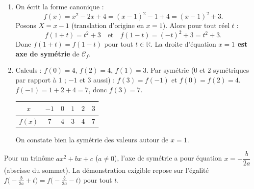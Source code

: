 \documentclass[11pt]{article}
\begin{document}
\begin{corrige}
\begin{enumerate}
    \item On écrit la forme canonique :
    \[ f(x)=x^2-2x+4=(x-1)^2-1+4=(x-1)^2+3. \]
    Posons $X=x-1$ (translation d'origine en $x=1$). Alors pour tout réel $t$ :
    \[ f(1+t)=t^2+3 \quad\text{et}\quad f(1-t)=(-t)^2+3=t^2+3. \]
    Donc $f(1+t)=f(1-t)$ pour tout $t\in\mathbb{R}$. La droite d'équation \textbf{$x=1$ est axe de symétrie} de $\mathcal{C}_f$.
    \item Calculs : $f(0)=4$, $f(2)=4$, $f(1)=3$.
    Par symétrie ($0$ et $2$ symétriques par rapport à $1$ ; $-1$ et $3$ aussi) : $f(3)=f(-1)$ et $f(0)=f(2)=4$.
    $f(-1)=1+2+4=7$, donc $f(3)=7$.
    \begin{center}
    \begin{tabular}{|c|c|c|c|c|c|}\hline
    $x$ & $-1$ & $0$ & $1$ & $2$ & $3$ \\ \hline
    $f(x)$ & $7$ & $4$ & $3$ & $4$ & $7$ \\ \hline
    \end{tabular}
    \end{center}
    On constate bien la symétrie des valeurs autour de $x=1$.
\end{enumerate}
\begin{propriete}
Pour un trinôme $ax^2+bx+c$ ($a\neq 0$), l'axe de symétrie a pour équation $x=-\dfrac{b}{2a}$ (abscisse du sommet).
La démonstration exigible repose sur l'égalité $f\big(-\frac{b}{2a}+t\big)=f\big(-\frac{b}{2a}-t\big)$ pour tout $t$.
\end{propriete}
\end{corrige}
\end{document}
